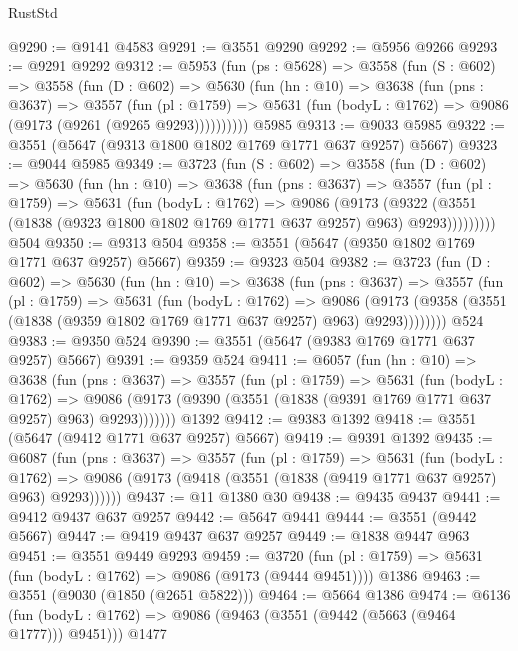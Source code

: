 \begin{lexlean}{RustStd}
\begin{coremodule}
@9290 := @9141 @4583
@9291 := @3551 @9290
@9292 := @5956 @9266
@9293 := @9291 @9292
@9312 := @5953
    (fun (ps : @5628) =>
    @3558
      (fun (S : @602) =>
      @3558
        (fun (D : @602) =>
        @5630
          (fun (hn : @10) =>
          @3638
            (fun (pns : @3637) =>
            @3557
              (fun (pl : @1759) =>
              @5631 (fun (bodyL : @1762) => @9086 (@9173 (@9261 (@9265 @9293))))))))))
    @5985
@9313 := @9033 @5985
@9322 := @3551 (@5647 (@9313 @1800 @1802 @1769 @1771 @637 @9257) @5667)
@9323 := @9044 @5985
@9349 := @3723
    (fun (S : @602) =>
    @3558
      (fun (D : @602) =>
      @5630
        (fun (hn : @10) =>
        @3638
          (fun (pns : @3637) =>
          @3557
            (fun (pl : @1759) =>
            @5631
              (fun (bodyL : @1762) =>
              @9086
                (@9173
                  (@9322
                    (@3551 (@1838 (@9323 @1800 @1802 @1769 @1771 @637 @9257) @963) @9293)))))))))
    @504
@9350 := @9313 @504
@9358 := @3551 (@5647 (@9350 @1802 @1769 @1771 @637 @9257) @5667)
@9359 := @9323 @504
@9382 := @3723
    (fun (D : @602) =>
    @5630
      (fun (hn : @10) =>
      @3638
        (fun (pns : @3637) =>
        @3557
          (fun (pl : @1759) =>
          @5631
            (fun (bodyL : @1762) =>
            @9086
              (@9173 (@9358 (@3551 (@1838 (@9359 @1802 @1769 @1771 @637 @9257) @963) @9293))))))))
    @524
@9383 := @9350 @524
@9390 := @3551 (@5647 (@9383 @1769 @1771 @637 @9257) @5667)
@9391 := @9359 @524
@9411 := @6057
    (fun (hn : @10) =>
    @3638
      (fun (pns : @3637) =>
      @3557
        (fun (pl : @1759) =>
        @5631
          (fun (bodyL : @1762) =>
          @9086 (@9173 (@9390 (@3551 (@1838 (@9391 @1769 @1771 @637 @9257) @963) @9293)))))))
    @1392
@9412 := @9383 @1392
@9418 := @3551 (@5647 (@9412 @1771 @637 @9257) @5667)
@9419 := @9391 @1392
@9435 := @6087
    (fun (pns : @3637) =>
    @3557
      (fun (pl : @1759) =>
      @5631
        (fun (bodyL : @1762) =>
        @9086 (@9173 (@9418 (@3551 (@1838 (@9419 @1771 @637 @9257) @963) @9293))))))
@9437 := @11 @1380 @30
@9438 := @9435 @9437
@9441 := @9412 @9437 @637 @9257
@9442 := @5647 @9441
@9444 := @3551 (@9442 @5667)
@9447 := @9419 @9437 @637 @9257
@9449 := @1838 @9447 @963
@9451 := @3551 @9449 @9293
@9459 := @3720
    (fun (pl : @1759) => @5631 (fun (bodyL : @1762) => @9086 (@9173 (@9444 @9451))))
    @1386
@9463 := @3551 (@9030 (@1850 (@2651 @5822)))
@9464 := @5664 @1386
@9474 := @6136
    (fun (bodyL : @1762) => @9086 (@9463 (@3551 (@9442 (@5663 (@9464 @1777))) @9451)))
    @1477

\end{coremodule}
\end{lexlean}
